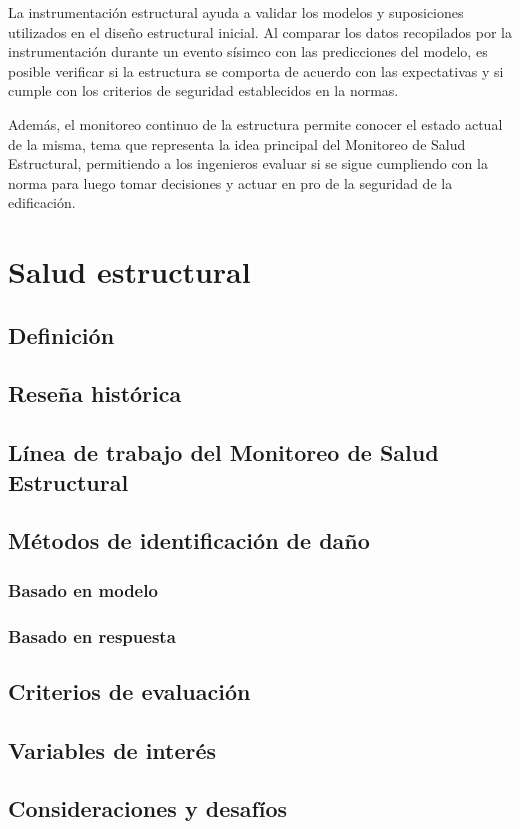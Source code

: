 La instrumentación estructural ayuda a validar los modelos y suposiciones utilizados en el diseño estructural inicial. Al comparar los datos recopilados por la instrumentación durante un evento sísimco con las predicciones del modelo, es posible verificar si la estructura se comporta de acuerdo con las expectativas y si cumple con los criterios de seguridad establecidos en la normas.

Además, el monitoreo continuo de la estructura permite conocer el estado actual de la misma, tema que representa la idea principal del Monitoreo de Salud Estructural, permitiendo a los ingenieros evaluar si se sigue cumpliendo con la norma para luego tomar decisiones y actuar en pro de la seguridad de la edificación.


\section{Salud estructural}



\subsection{Definición}

\subsection{Reseña histórica}

\subsection{Línea de trabajo del Monitoreo de Salud Estructural}

\subsection{Métodos de identificación de daño}

        \subsubsection{Basado en modelo}

        \subsubsection{Basado en respuesta}

\subsection{Criterios de evaluación}

\subsection{Variables de interés}

\subsection{Consideraciones y desafíos}


